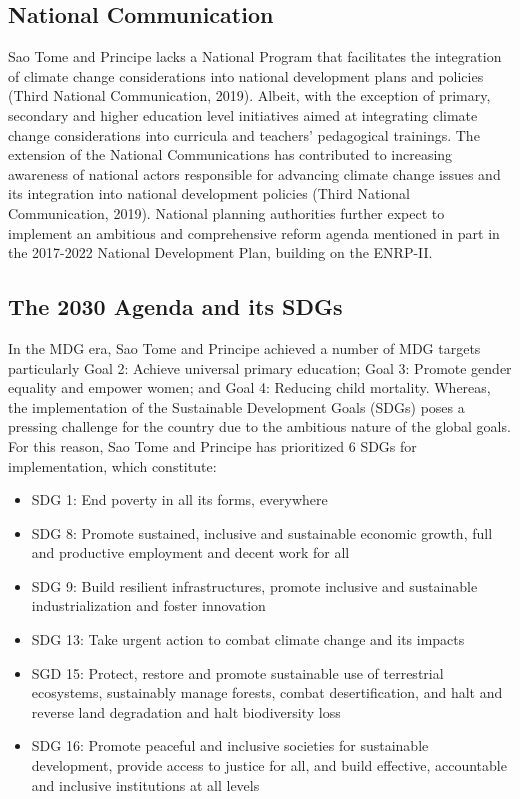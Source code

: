 \documentclass[
]{book}
\providecommand{\tightlist}{%
  \setlength{\itemsep}{0pt}\setlength{\parskip}{0pt}}
\begin{document}
\hypertarget{national-communication}{%
\subsection{National Communication}\label{national-communication}}

Sao Tome and Principe lacks a National Program that facilitates the integration of climate change considerations into national development plans and policies (Third National Communication, 2019). Albeit, with the exception of primary, secondary and higher education level initiatives aimed at integrating climate change considerations into curricula and teachers' pedagogical trainings. The extension of the National Communications has contributed to increasing awareness of national actors responsible for advancing climate change issues and its integration into national development policies (Third National Communication, 2019). National planning authorities further expect to implement an ambitious and comprehensive reform agenda mentioned in part in the 2017-2022 National Development Plan, building on the ENRP-II.

\hypertarget{the-2030-agenda-and-its-sdgs}{%
\subsection{The 2030 Agenda and its SDGs}\label{the-2030-agenda-and-its-sdgs}}

In the MDG era, Sao Tome and Principe achieved a number of MDG targets particularly Goal 2: Achieve universal primary education; Goal 3: Promote gender equality and empower women; and Goal 4: Reducing child mortality. Whereas, the implementation of the Sustainable Development Goals (SDGs) poses a pressing challenge for the country due to the ambitious nature of the global goals. For this reason, Sao Tome and Principe has prioritized 6 SDGs for implementation, which constitute:

\begin{itemize}
\tightlist
\item
  SDG 1: End poverty in all its forms, everywhere
\item
  SDG 8: Promote sustained, inclusive and sustainable economic growth, full and productive employment and decent work for all
\item
  SDG 9: Build resilient infrastructures, promote inclusive and sustainable industrialization and foster innovation
\item
  SDG 13: Take urgent action to combat climate change and its impacts
\item
  SGD 15: Protect, restore and promote sustainable use of terrestrial ecosystems, sustainably manage forests, combat desertification, and halt and reverse land degradation and halt biodiversity loss
\item
  SDG 16: Promote peaceful and inclusive societies for sustainable development, provide access to justice for all, and build effective, accountable and inclusive institutions at all levels
\end{itemize}
\end{document}

